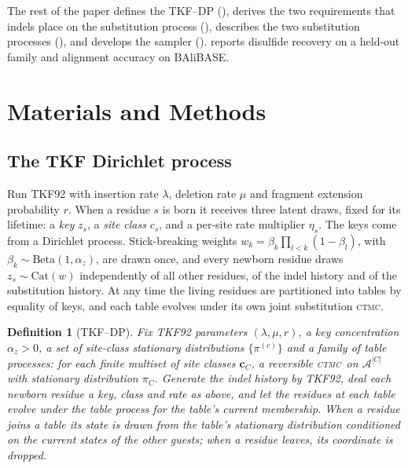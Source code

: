 \documentclass[11pt]{article}
\newtheorem{defn}{Definition}
\newcommand{\CTMC}{\textsc{ctmc}}
\newcommand{\Xset}{\mathcal{A}}
\newcommand{\eqm}{\pi}
\begin{document}
The rest of the paper defines the TKF--DP (), derives
the two requirements that indels place on the substitution process
(), describes the two substitution processes
(), and develops the sampler
().  reports disulfide recovery
on a held-out family and alignment accuracy on BAliBASE.

\section{Materials and Methods}
\label{sec:methods}

\subsection{The TKF Dirichlet process}
\label{sec:skeleton}

Run TKF92 with insertion rate $\lambda$, deletion rate $\mu$ and fragment
extension probability $r$. When a residue $s$ is born it receives three
latent draws, fixed for its lifetime: a \emph{key} $z_s$, a \emph{site class}
$c_s$, and a per-site rate multiplier $\eta_s$. The keys come from a
Dirichlet process. Stick-breaking weights
$w_k=\beta_k\prod_{l<k}(1-\beta_l)$, with
$\beta_k\sim\mathrm{Beta}(1,\alpha_z)$, are drawn once, and every newborn
residue draws $z_s\sim\mathrm{Cat}(w)$ independently of all other residues, of
the indel history and of the substitution history. At any time the living
residues are partitioned into tables by equality of keys, and each table
evolves under its own joint substitution \CTMC.

\begin{defn}[TKF--DP]
\label{defn:tkfdp}
Fix TKF92 parameters $(\lambda,\mu,r)$, a key concentration $\alpha_z>0$, a
set of site-class stationary distributions $\{\eqm^{(c)}\}$ and a family of
table processes: for each finite multiset of site classes $\bm c_C$, a
reversible \CTMC\ on $\Xset^{|C|}$ with stationary distribution $\eqm_C$.
Generate the indel history by TKF92, deal each newborn residue a key, class
and rate as above, and let the residues at each table evolve under the table
process for the table's current membership. When a residue joins a table its
state is drawn from the table's stationary distribution conditioned on the
current states of the other guests; when a residue leaves, its coordinate is
dropped.
\end{defn}
\end{document}
